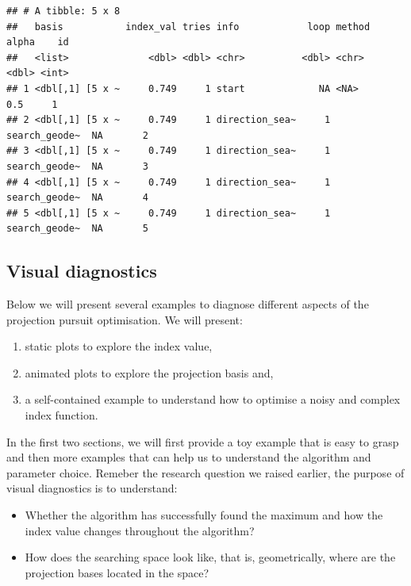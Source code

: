 \documentclass[12pt]{article}
\begin{document}
\begin{verbatim}
## # A tibble: 5 x 8
##   basis           index_val tries info            loop method        alpha    id
##   <list>              <dbl> <dbl> <chr>          <dbl> <chr>         <dbl> <int>
## 1 <dbl[,1] [5 x ~     0.749     1 start             NA <NA>            0.5     1
## 2 <dbl[,1] [5 x ~     0.749     1 direction_sea~     1 search_geode~  NA       2
## 3 <dbl[,1] [5 x ~     0.749     1 direction_sea~     1 search_geode~  NA       3
## 4 <dbl[,1] [5 x ~     0.749     1 direction_sea~     1 search_geode~  NA       4
## 5 <dbl[,1] [5 x ~     0.749     1 direction_sea~     1 search_geode~  NA       5
\end{verbatim}

\hypertarget{visual-diagnostics}{%
\subsection{Visual diagnostics}\label{visual-diagnostics}}

Below we will present several examples to diagnose different aspects of
the projection pursuit optimisation. We will present:

\begin{enumerate}
\def\labelenumi{\arabic{enumi})}
\item
  static plots to explore the index value,
\item
  animated plots to explore the projection basis and,
\item
  a self-contained example to understand how to optimise a noisy and
  complex index function.
\end{enumerate}

In the first two sections, we will first provide a toy example that is
easy to grasp and then more examples that can help us to understand the
algorithm and parameter choice. Remeber the research question we raised
earlier, the purpose of visual diagnostics is to understand:

\begin{itemize}
\item
  Whether the algorithm has successfully found the maximum and how the
  index value changes throughout the algorithm?
\item
  How does the searching space look like, that is, geometrically, where
  are the projection bases located in the space?
\end{itemize}
\end{document}
